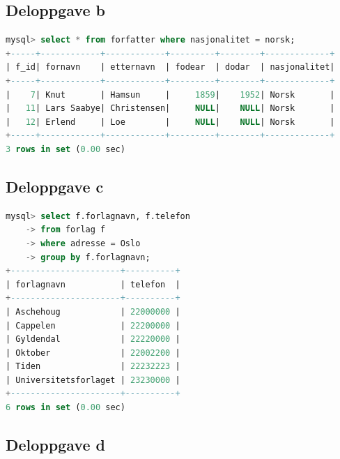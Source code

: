 \documentclass[a4paper, 12pt] {article}
\begin{document}
\subsection{Deloppgave b}

\begin{lstlisting}[language=SQL, label=oppg3b, caption=Oppgave 3b]
mysql> select * from forfatter where nasjonalitet = norsk;
+-----+------------+------------+---------+--------+-------------+
| f_id| fornavn    | etternavn  | fodear  | dodar  | nasjonalitet|
+-----+------------+------------+---------+--------+-------------+
|    7| Knut       | Hamsun     |     1859|    1952| Norsk       |
|   11| Lars Saabye| Christensen|     NULL|    NULL| Norsk       |
|   12| Erlend     | Loe        |     NULL|    NULL| Norsk       |
+-----+------------+------------+---------+--------+-------------+
3 rows in set (0.00 sec)
\end{lstlisting}
\newpage

\subsection{Deloppgave c}

\begin{lstlisting}[language=SQL, label=oppg3c, caption=Oppgave 3c]
mysql> select f.forlagnavn, f.telefon
    -> from forlag f 
    -> where adresse = Oslo 
    -> group by f.forlagnavn;
+----------------------+----------+
| forlagnavn           | telefon  |
+----------------------+----------+
| Aschehoug            | 22000000 |
| Cappelen             | 22200000 |
| Gyldendal            | 22220000 |
| Oktober              | 22002200 |
| Tiden                | 22232223 |
| Universitetsforlaget | 23230000 |
+----------------------+----------+
6 rows in set (0.00 sec)
\end{lstlisting}

\subsection{Deloppgave d}
\end{document}
